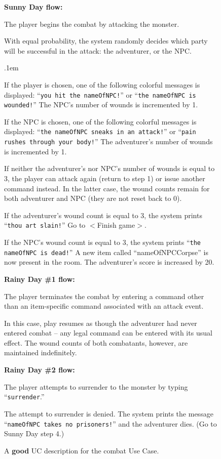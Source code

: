 \begin{figure}
\begin{center}
{{\vspace{.05in}
\textsf{\textbf{Sunny Day flow:}}
\begin{compactenum}
\item \textsf{The player begins the combat by attacking the monster.}
\item \textsf{With equal probability, the system randomly decides which party
will be successful in the attack: the adventurer, or the NPC.}
    \begin{compactitem}
    \itemsep.1em
    \item \textsf{If the player is chosen, one of the following colorful
messages is displayed: ``\texttt{you hit the nameOfNPC!}'' or ``\texttt{the
nameOfNPC is wounded!}'' The NPC's number of wounds is incremented by 1.}
    \item \textsf{If the NPC is chosen, one of the following colorful messages
is displayed: ``\texttt{the nameOfNPC sneaks in an attack!}'' or
``\texttt{pain rushes through your body!}'' The adventurer's number of wounds
is incremented by 1.}
    \end{compactitem}
\item \textsf{If neither the adventurer's nor NPC's number of wounds is equal
to 3, the player can attack again (return to step 1) or issue another command
instead. In the latter case, the wound counts remain for both adventurer and
NPC (they are not reset back to 0).}
\item \textsf{If the adventurer's wound count is equal to 3, the system prints
``\texttt{thou art slain!}'' Go to $<$Finish game$>$.}
\item \textsf{If the NPC's wound count is equal to 3, the system prints
``\texttt{the nameOfNPC is dead!}'' A new item called ``nameOfNPCCorpse'' is
now present in the
room. The adventurer's score is increased by 20.}
\end{compactenum}
\vspace{.05in}
\textsf{\textbf{Rainy Day \#1 flow:}}
\begin{compactenum}
\item \textsf{The player terminates the combat by entering a command other
than an item-specific command associated with an attack event.}
\item \textsf{In this case, play resumes as though the adventurer had never
entered combat -- any legal command can be entered with its usual effect. The
wound counts of both combatants, however, are maintained indefinitely.}
\end{compactenum}
\textsf{\textbf{Rainy Day \#2 flow:}}
\begin{compactenum}
\item \textsf{The player attempts to surrender to the monster by typing
``\texttt{surrender}.''}
\item \textsf{The attempt to surrender is denied. The system prints the
message ``\texttt{nameOfNPC takes no prisoners!}'' and the adventurer dies.
(Go to Sunny Day step 4.)}
\end{compactenum}
}}
\end{center}
\caption{A \textbf{good} UC description for the combat Use Case.}
\label{fig:duelUCGood}
\end{figure}

